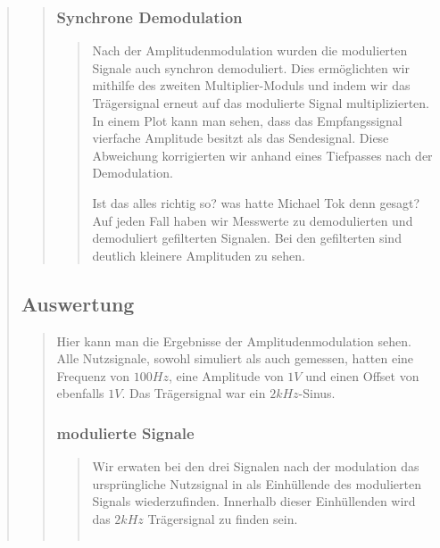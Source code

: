 \begin{quote}
\begin{quote}
    	\vspace{1em}
    	
    	\subsubsection{Synchrone Demodulation}
    	\begin{quote}
    	Nach der Amplitudenmodulation wurden die modulierten Signale auch
    	synchron demoduliert. Dies ermöglichten wir mithilfe des zweiten
    	Multiplier-Moduls und indem wir das Trägersignal erneut auf das modulierte
    	Signal multiplizierten. In einem Plot kann man sehen, dass das
    	Empfangssignal vierfache Amplitude besitzt als das Sendesignal.
    	Diese Abweichung korrigierten wir anhand eines Tiefpasses nach der
    	Demodulation.
    	
    	Ist das alles richtig so? was hatte Michael Tok denn gesagt? Auf jeden Fall
    	haben wir Messwerte zu demodulierten und demoduliert gefilterten Signalen.
    	Bei den gefilterten sind deutlich kleinere Amplituden zu sehen.
		\end{quote}    
    
    \end{quote}
    
    \subsection{Auswertung}
    \begin{quote}
        
        Hier kann man die Ergebnisse der Amplitudenmodulation sehen. Alle Nutzsignale, sowohl simuliert als auch
        gemessen, hatten eine Frequenz von $100 Hz$, eine Amplitude von $1 V$ und einen Offset von ebenfalls $1 V$. Das
        Trägersignal war ein $2 kHz$-Sinus.
        
        \subsubsection{modulierte Signale}
		\begin{quote}
		  
		  Wir erwaten bei den drei Signalen nach der modulation das ursprüngliche Nutzsignal in als Einhüllende des
		  modulierten Signals wiederzufinden. Innerhalb dieser Einhüllenden wird das $2kHz$ Trägersignal zu finden sein.
		  
            \begin{center}
                \begin{tabular}{ll}
    

\end{tabular}
\end{center}
\end{quote}
\end{quote}
\end{quote}
